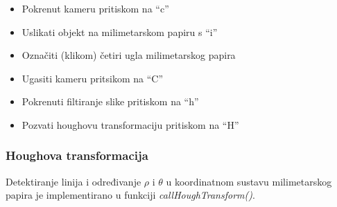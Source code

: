 \begin{itemize}
    \item Pokrenut kameru pritiskom na ``c''
    \item Uslikati objekt na milimetarskom papiru s ``i''
    \item Označiti (klikom) četiri ugla milimetarskog papira
    \item Ugasiti kameru pritsikom na ``C''
    \item Pokrenuti filtiranje slike pritiskom na ``h''
    \item Pozvati houghovu transformaciju pritiskom na ``H''
\end{itemize}


\subsubsection{Houghova transformacija}
Detektiranje linija i određivanje  \(\rho \) i \( \theta \) u
koordinatnom sustavu milimetarskog papira je implementirano u funkciji
\textit{callHoughTransform()}.

